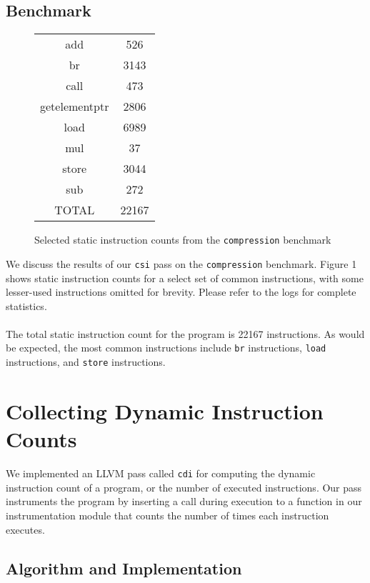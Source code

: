\documentclass[12pt]{article}
\begin{document}
\subsection{Benchmark}

\begin{figure*}[!t]
\begin{center}
\begin{tabular} { |c|c| }
\hline
	add & 526 \\
	br & 3143 \\
	call & 473 \\
	getelementptr & 2806 \\
	load & 6989 \\
	mul & 37 \\
	store & 3044 \\
	sub & 272 \\
	TOTAL & 22167 \\
\hline
\end{tabular}
\caption{Selected static instruction counts from the {\tt compression} benchmark}
\label{STATIC}
\end{center}
\end{figure*}

We discuss the results of our {\tt csi} pass on the {\tt compression} benchmark. Figure 1 shows static instruction counts for a select set of common instructions, with some lesser-used instructions omitted for brevity. Please refer to the logs for complete statistics.
\\\\
The total static instruction count for the program is 22167 instructions. As would be expected, the most common instructions include {\tt br} instructions, {\tt load} instructions, and {\tt store} instructions. 


\section{Collecting Dynamic Instruction Counts}

We implemented an LLVM pass called {\tt cdi} for computing the dynamic instruction count of a program, or the number of executed instructions. Our pass instruments the program by inserting a call during execution to a function in our instrumentation module that counts the number of times each instruction executes. 

\subsection{Algorithm and Implementation}
\end{document}
